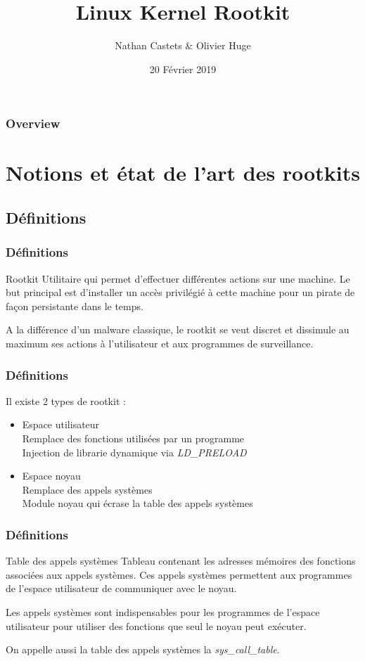 \documentclass{beamer}
\title[Linux Kernel Rootkit]{Linux Kernel Rootkit}
\author{Nathan Castets \& Olivier Huge}
\institute[UBX]{Université de Bordeaux}
\date{20 Février 2019}
\begin{document}
\begin{frame}
\titlepage
\end{frame}

\begin{frame}
\frametitle{Overview}
\tableofcontents
\end{frame}

\section{Notions et état de l'art des rootkits}
\subsection{Définitions}

\begin{frame}
\frametitle{Définitions}
\begin{block}{Rootkit}
Utilitaire qui permet d'effectuer différentes actions sur une machine. Le but principal est d'installer un accès privilégié à cette machine pour un pirate de façon persistante dans le temps.
\end{block}
\medskip
A la différence d'un malware classique, le rootkit se veut discret et dissimule au maximum ses actions à l'utilisateur et aux programmes de surveillance.
\end{frame}

\begin{frame}
\frametitle{Définitions}
Il existe 2 types de rootkit :
\begin{itemize}
\item 	Espace utilisateur\\
	Remplace des fonctions utilisées par un programme\\
	Injection de librarie dynamique via \textit{LD\_PRELOAD}
\item	Espace noyau\\
	Remplace des appels systèmes\\
	Module noyau qui écrase la table des appels systèmes
\end{itemize}
\end{frame}

\begin{frame}
\frametitle{Définitions}
\begin{block}{Table des appels systèmes}
Tableau contenant les adresses mémoires des fonctions associées aux appels systèmes. Ces appels systèmes permettent aux programmes de l'espace utilisateur de communiquer avec le noyau.
\end{block}
\medskip
Les appels systèmes sont indispensables pour les programmes de l'espace utilisateur pour utiliser des fonctions que seul le noyau peut exécuter.

On appelle aussi la table des appels systèmes la \textit{sys\_call\_table}.
\end{frame}
\end{document}
